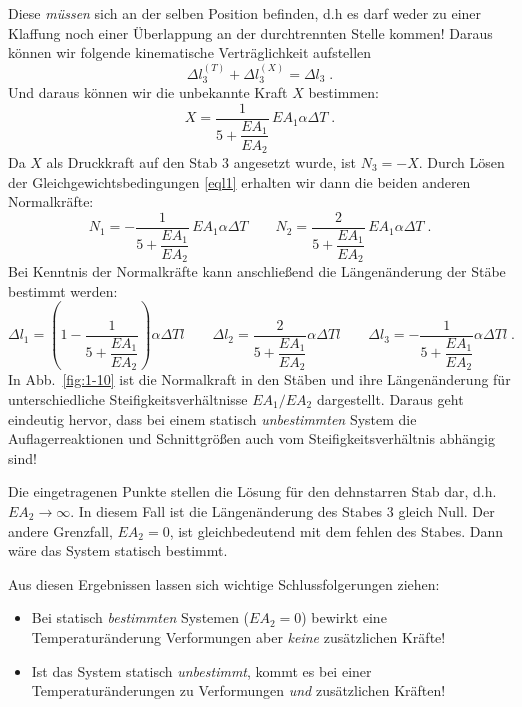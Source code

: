 \begin{example}
	Diese \emph{müssen} sich an der selben Position befinden, d.h es darf weder zu einer Klaffung noch einer Überlappung an der durchtrennten Stelle kommen!
	Daraus können wir folgende kinematische Verträglichkeit aufstellen
	\begin{equation}
	\Delta l_3^{(T)} + \Delta l_3^{(X)} = \Delta l_3 \; .
	\end{equation}
	Und daraus können wir die unbekannte Kraft $X$ bestimmen:
	\begin{equation}
		X = \dfrac{1}{5+\dfrac{EA_1}{EA_2}}\,EA_1\alpha\Delta T  \; .
	\end{equation}
	Da $X$ als Druckkraft auf den Stab $3$ angesetzt wurde, ist $N_3=-X$. Durch Lösen der Gleichgewichtsbedingungen \eqref{eql1} erhalten wir dann die beiden anderen Normalkräfte:
	\begin{equation}
		N_1 = -\dfrac{1}{5+\dfrac{EA_1}{EA_2}}\,EA_1\alpha\Delta T  \quad \text{} \quad 
		N_2 = \dfrac{2}{5+\dfrac{EA_1}{EA_2}}\,EA_1\alpha\Delta T \; .
	\end{equation}
	Bei Kenntnis der Normalkräfte kann anschließend die Längenänderung der Stäbe bestimmt werden:
	\begin{equation}
	\Delta l_1=  \left(1-\dfrac{1}{5+\dfrac{EA_1}{EA_2}}\right)\alpha\Delta T l \qquad
	\Delta l_2=  \dfrac{2}{5+\dfrac{EA_1}{EA_2}}\alpha\Delta T l \qquad
	\Delta l_3= -\dfrac{1}{5+\dfrac{EA_1}{EA_2}}\alpha\Delta T l \; .
	\end{equation}
	In Abb.~\ref{fig:1-10} ist die Normalkraft in den Stäben und ihre Längenänderung für unterschiedliche Steifigkeitsverhältnisse $EA_1/EA_2$ dargestellt.
	Daraus geht eindeutig hervor, dass bei einem statisch \emph{unbestimmten} System die Auflagerreaktionen und Schnittgrößen auch vom Steifigkeitsverhältnis abhängig sind! 
	
	Die eingetragenen Punkte stellen die Lösung für den dehnstarren Stab dar, d.h. $EA_2\rightarrow\infty$.
	In diesem Fall ist die Längenänderung des Stabes $3$ gleich Null.
	Der andere Grenzfall, $EA_2=0$, ist gleichbedeutend mit dem fehlen des Stabes.
	Dann wäre das System statisch bestimmt. 
	
	Aus diesen Ergebnissen lassen sich wichtige Schlussfolgerungen ziehen:
	\begin{itemize}
		\item Bei statisch \emph{bestimmten} Systemen ($EA_2=0$) bewirkt eine Temperaturänderung Verformungen aber \emph{keine} zusätzlichen Kräfte!
		\item Ist das System statisch \emph{unbestimmt}, kommt es bei einer Temperaturänderungen zu Verformungen \emph{und} zusätzlichen Kräften!
	\end{itemize}
	
	\captionsetup{type=figure,justification=centering}
	\begin{center}
		
	\end{center}
	\nopagebreak
	\caption{Normalkräfte und Längenänderungen der Stäbe  in Abhängigkeit vom Steifigkeitsverhältnis~$EA_1/EA_2$}
	\label{fig:1-10}
		 
\end{example}

